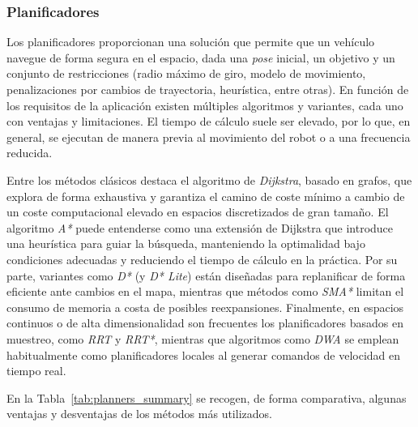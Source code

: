     \subsubsection*{Planificadores}
    Los planificadores proporcionan una solución que permite que un vehículo navegue de forma segura en el espacio, dada una \textit{pose}
    inicial, un objetivo y un conjunto de restricciones (radio máximo de giro, modelo de movimiento, penalizaciones por cambios de trayectoria,
    heurística, entre otras). En función de los requisitos de la aplicación existen múltiples algoritmos y variantes, cada uno con ventajas y
    limitaciones. El tiempo de cálculo suele ser elevado, por lo que, en general, se ejecutan de manera previa al movimiento del robot o a una
    frecuencia reducida.

    Entre los métodos clásicos destaca el algoritmo de \textit{Dijkstra}, basado en grafos, que explora de forma exhaustiva y garantiza el
    camino de coste mínimo a cambio de un coste computacional elevado en espacios discretizados de gran tamaño. El algoritmo \textit{A*} puede
    entenderse como una extensión de Dijkstra que introduce una heurística para guiar la búsqueda, manteniendo la optimalidad bajo condiciones
    adecuadas y reduciendo el tiempo de cálculo en la práctica. Por su parte, variantes como \textit{D*} (y \textit{D* Lite}) están diseñadas
    para replanificar de forma eficiente ante cambios en el mapa, mientras que métodos como \textit{SMA*} limitan el consumo de memoria a costa
    de posibles reexpansiones. Finalmente, en espacios continuos o de alta dimensionalidad son frecuentes los planificadores basados en muestreo,
    como \textit{RRT} y \textit{RRT*}, mientras que algoritmos como \textit{DWA} se emplean habitualmente como planificadores locales al generar
    comandos de velocidad en tiempo real.

    En la Tabla~\ref{tab:planners_summary} se recogen, de forma comparativa, algunas ventajas y desventajas de los métodos más utilizados.

